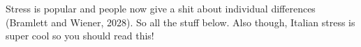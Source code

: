 Stress is popular and people now give a shit about individual differences (Bramlett and Wiener, 2028). So all the stuff below. Also though, Italian stress is super cool so you should read this!